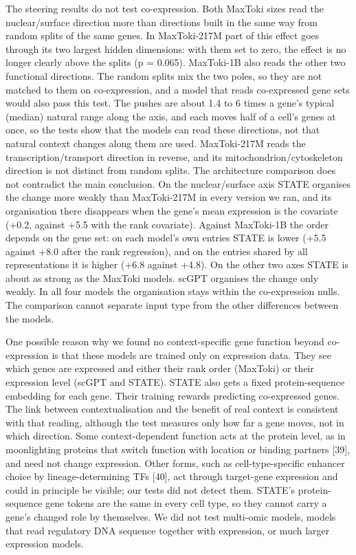 \documentclass[
  11pt,
]{article}
\begin{document}
The steering results do not test co-expression. Both MaxToki sizes read
the nuclear/surface direction more than directions built in the same way
from random splits of the same genes. In MaxToki-217M part of this
effect goes through its two largest hidden dimensions: with them set to
zero, the effect is no longer clearly above the splits (p = 0.065).
MaxToki-1B also reads the other two functional directions. The random
splits mix the two poles, so they are not matched to them on
co-expression, and a model that reads co-expressed gene sets would also
pass this test. The pushes are about 1.4 to 6 times a gene's typical
(median) natural range along the axis, and each moves half of a cell's
genes at once, so the tests show that the models can read these
directions, not that natural context changes along them are used.
MaxToki-217M reads the transcription/transport direction in reverse, and
its mitochondrion/cytoskeleton direction is not distinct from random
splits. The architecture comparison does not contradict the main
conclusion. On the nuclear/surface axis STATE organises the change more
weakly than MaxToki-217M in every version we ran, and its organisation
there disappears when the gene's mean expression is the covariate (+0.2,
against +5.5 with the rank covariate). Against MaxToki-1B the order
depends on the gene set: on each model's own entries STATE is lower
(+5.5 against +8.0 after the rank regression), and on the entries shared
by all representations it is higher (+6.8 against +4.8). On the other
two axes STATE is about as strong as the MaxToki models. scGPT organises
the change only weakly. In all four models the organisation stays within
the co-expression nulls. The comparison cannot separate input type from
the other differences between the models.

One possible reason why we found no context-specific gene function
beyond co-expression is that these models are trained only on expression
data. They see which genes are expressed and either their rank order
(MaxToki) or their expression level (scGPT and STATE). STATE also gets a
fixed protein-sequence embedding for each gene. Their training rewards
predicting co-expressed genes. The link between contextualisation and
the benefit of real context is consistent with that reading, although
the test measures only how far a gene moves, not in which direction.
Some context-dependent function acts at the protein level, as in
moonlighting proteins that switch function with location or binding
partners {[}39{]}, and need not change expression. Other forms, such as
cell-type-specific enhancer choice by lineage-determining TFs {[}40{]},
act through target-gene expression and could in principle be visible;
our tests did not detect them. STATE's protein-sequence gene tokens are
the same in every cell type, so they cannot carry a gene's changed role
by themselves. We did not test multi-omic models, models that read
regulatory DNA sequence together with expression, or much larger
expression models.
\end{document}
